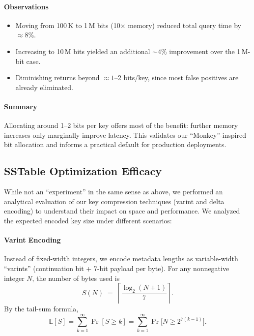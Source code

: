 \documentclass[10pt]{article}
\begin{document}
\paragraph{Observations}
\begin{itemize}[itemsep=0.5ex]
  \item Moving from 100\,K to 1\,M bits (10× memory) reduced total query time by $\approx8\%$.
  \item Increasing to 10\,M bits yielded an additional $\sim4\%$ improvement over the 1\,M-bit case.
  \item Diminishing returns beyond \(\approx1\)–2 bits/key, since most false positives are already eliminated.
\end{itemize}

\paragraph{Summary}
Allocating around 1–2 bits per key offers most of the benefit: further memory increases only marginally improve latency. This validates our “Monkey”-inspired bit allocation and informs a practical default for production deployments.  


\subsection{SSTable Optimization Efficacy}
While not an “experiment” in the same sense as above, we performed an analytical evaluation of our key compression techniques (varint and delta encoding) to understand their impact on space and performance. We analyzed the expected encoded key size under different scenarios:
\paragraph{Varint Encoding}  
Instead of fixed-width integers, we encode metadata lengths as variable-width “varints” (continuation bit + 7-bit payload per byte).  For any nonnegative integer \(N\), the number of bytes used is
\[
S(N) \;=\;\left\lceil \frac{\log_{2}(N+1)}{7} \right\rceil.
\]
By the tail-sum formula,
\[
\mathbb{E}[S] = \sum_{k=1}^{\infty} \Pr[S \ge k]
           = \sum_{k=1}^{\infty} \Pr\bigl[N \ge 2^{7(k-1)}\bigr].
\]
\end{document}
